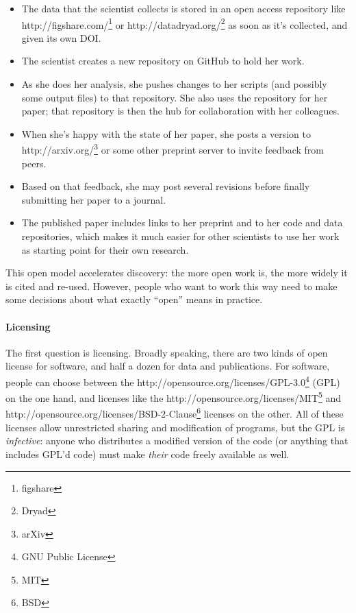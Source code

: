 \documentclass[]{book}
\newcommand{\urlfoot}[2]{{#1}\footnote{#2}}
\newcommand{\gdef}[2]{\emph{#2}}
\begin{document}
\begin{itemize}
\item
  The data that the scientist collects is stored in an open access
  repository like \urlfoot{http://figshare.com/}{figshare} or
  \urlfoot{http://datadryad.org/}{Dryad} as soon as it's collected, and
  given its own DOI.
\item
  The scientist creates a new repository on GitHub to hold her work.
\item
  As she does her analysis, she pushes changes to her scripts (and
  possibly some output files) to that repository. She also uses the
  repository for her paper; that repository is then the hub for
  collaboration with her colleagues.
\item
  When she's happy with the state of her paper, she posts a version to
  \urlfoot{http://arxiv.org/}{arXiv} or some other preprint server to
  invite feedback from peers.
\item
  Based on that feedback, she may post several revisions before finally
  submitting her paper to a journal.
\item
  The published paper includes links to her preprint and to her code and
  data repositories, which makes it much easier for other scientists to
  use her work as starting point for their own research.
\end{itemize}

This open model accelerates discovery: the more open work is, the more
widely it is cited and re-used. However, people who want to work this
way need to make some decisions about what exactly ``open'' means in
practice.

\mbox{}\paragraph{Licensing}

The first question is licensing. Broadly speaking, there are two kinds
of open license for software, and half a dozen for data and
publications. For software, people can choose between the
\urlfoot{http://opensource.org/licenses/GPL-3.0}{GNU Public License} (GPL)
on the one hand, and licenses like the
\urlfoot{http://opensource.org/licenses/MIT}{MIT} and
\urlfoot{http://opensource.org/licenses/BSD-2-Clause}{BSD} licenses on the
other. All of these licenses allow unrestricted sharing and modification
of programs, but the GPL is \gdef{g:infective-license}{infective}:
anyone who distributes a modified version of the code (or anything that
includes GPL'd code) must make \emph{their} code freely available as
well.
\end{document}
